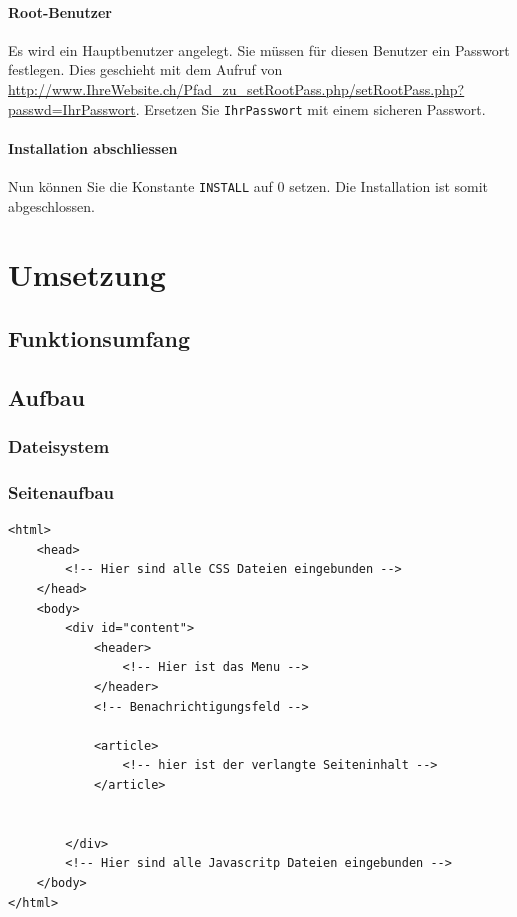 \documentclass[ngerman, 12pt, pdftex]{scrartcl}[2006/07/30]
\begin{document}
	\paragraph{Root-Benutzer}
		Es wird ein Hauptbenutzer angelegt. Sie müssen für diesen Benutzer ein Passwort festlegen. 
		Dies geschieht mit dem Aufruf von \url{http://www.IhreWebsite.ch/Pfad_zu_setRootPass.php/setRootPass.php?passwd=IhrPasswort}.
		Ersetzen Sie \verb+IhrPasswort+ mit einem sicheren Passwort.
	\paragraph{Installation abschliessen}
		Nun können Sie die Konstante \verb+INSTALL+ auf 0 setzen. Die Installation ist somit abgeschlossen.
    
  





\section{Umsetzung}
\subsection{Funktionsumfang}


\subsection{Aufbau}
	\subsubsection{Dateisystem}
		
	\subsubsection{Seitenaufbau}
	\lstset{language=html}
\begin{lstlisting}
<html>
	<head>
		<!-- Hier sind alle CSS Dateien eingebunden -->
	</head>
	<body>
		<div id="content">
			<header>
				<!-- Hier ist das Menu -->
			</header>
			<!-- Benachrichtigungsfeld -->
			
			<article>
				<!-- hier ist der verlangte Seiteninhalt -->
			</article>
					
					
		</div>
		<!-- Hier sind alle Javascritp Dateien eingebunden -->
	</body>
</html>
	\end{lstlisting}
	
\end{document}
